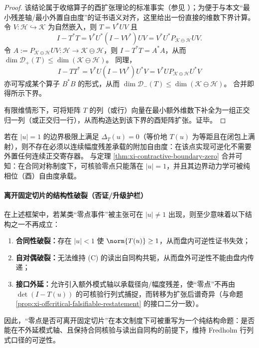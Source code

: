 \begin{proof}
该结论属于收缩算子的酉扩张理论的标准事实（参见 \cite{SzNagyFoias1970HarmonicAnalysis}）；为便于与本文“最小残差轴/最小外置自由度”的证书语义对齐，这里给出一份直接的维数下界计算。
令 \(V:\mathcal{H}\hookrightarrow\mathcal{K}\) 为自然嵌入，则 \(T=V^{*}UV\) 且
\[
I-T^{*}T
=V^{*}U^{*}(I-VV^{*})UV
=V^{*}U^{*}P_{\mathcal{K}\ominus\mathcal{H}}UV.
\]
令 \(A:=P_{\mathcal{K}\ominus\mathcal{H}}UV:\mathcal{H}\to\mathcal{K}\ominus\mathcal{H}\)，则 \(I-T^{*}T=A^{*}A\)，从而
\(
\dim\mathcal{D}_{+}(T)\le \dim(\mathcal{K}\ominus\mathcal{H})
\)。
同理，
\[
I-TT^{*}
=V^{*}U(I-VV^{*})U^{*}V
=V^{*}UP_{\mathcal{K}\ominus\mathcal{H}}U^{*}V
\]
亦可写成某个算子 \(B^{*}B\) 的形式，从而
\(
\dim\mathcal{D}_{-}(T)\le \dim(\mathcal{K}\ominus\mathcal{H})
\)。
合并即得所示下界。
\par
有限维情形下，可将矩阵 \(T\) 的列（或行）向量在最小额外维数下补全为一组正交归一列（或正交归一行），从而构造达到该下界的酉矩阵扩张。证毕。
\end{proof}

\begin{corollary}[缺陷消失的边界判别]\label{cor:xi-defect-vanishing-boundary}
若在 \(|u|=1\) 的边界极限上满足 \(\Delta_T(u)=0\)（等价地 \(T(u)\) 为等距且在闭包上满射），则不存在必须以连续幅度残差承载的附加自由度：在该点实现可逆化不需要外置任何连续正交寄存器。
与定理 \ref{thm:xi-contractive-boundary-zero} 合并可知：在合同对称制度下，可核验零点只能落在 \(|u|=1\)，并且其边界动力学可被纯相位（酉）自由度承载。
\end{corollary}

\paragraph{离开固定切片的结构性破裂（否证/升级护栏）}
在上述框架中，若某类“零点事件”被主张可在 \(|u|\neq 1\) 出现，则至少意味着以下结构之一不再成立：
\begin{enumerate}
  \item \textbf{合同性破裂：}存在 \(|u|<1\) 使 \(\norm{T(u)}\ge 1\)，从而盘内可逆性证书失效；
  \item \textbf{自对偶破裂：}无法维持 (C) 的读出自同构共轭，从而盘外可逆性不能由盘内传递；
  \item \textbf{接口外延：}允许引入额外模式轴以承载径向/幅度残差，使“零点”不再由 \(\det(I-T(u))\) 的可核验行列式捕捉，而转移为扩张后谱奇异（与命题 \ref{prop:xi-offcritical-falsifiable-restatement} 的接口二分一致）。
\end{enumerate}
因此，“零点是否可离开固定切片”在本文制度下可被重写为一个纯结构命题：是否能在不外延模式轴、且保持合同核验与读出自同构的前提下，维持 Fredholm 行列式口径的可逆性。
\par

